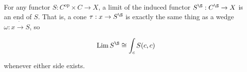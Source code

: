 For any functor $S: C^{\text{op}} \times C \rightarrow X$, a limit of the induced functor $S^{\S}: C^{\S} \rightarrow X$ is an end of $S$. That is, a cone $\tau: x \rightarrow S^{\S}$ is exactly the same thing as a wedge $\omega: x \mathbin{\dot{\rightarrow}} S$, so

$$\operatorname{Lim} S^{\S} \cong \int_c S(c, c)$$

whenever either side exists.
